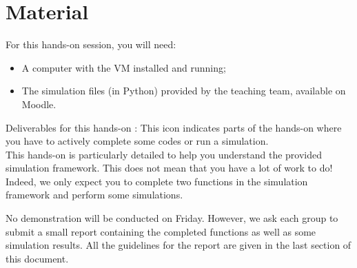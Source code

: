\section*{Material}

\begin{comment}[couleur = gray!20, arrondi = 0.2, logo=\bcinfo]{}
\vspace{0.2cm}
\end{comment}
For this hands-on session, you will need:
\begin{itemize}
    \item A computer with the VM installed and running;
    \item The simulation files (in Python) provided by the teaching team, available on Moodle.
\end{itemize}
\begin{bclogo}[couleur = gray!20, arrondi = 0.2, logo=\bcinfo]{Deliverables for this hands-on}
\bccrayon: This icon indicates parts of the hands-on where you have to actively complete some codes or run a simulation.\\

This hands-on is particularly detailed to help you understand the provided simulation framework. This does not mean that you have a lot of work to do! Indeed, we only expect you to complete two functions in the simulation framework and perform some simulations.

No demonstration will be conducted on Friday. However, we ask each group to submit a small report containing the completed functions as well as some simulation results. All the guidelines for the report are given in the last section of this document.

\end{bclogo}
